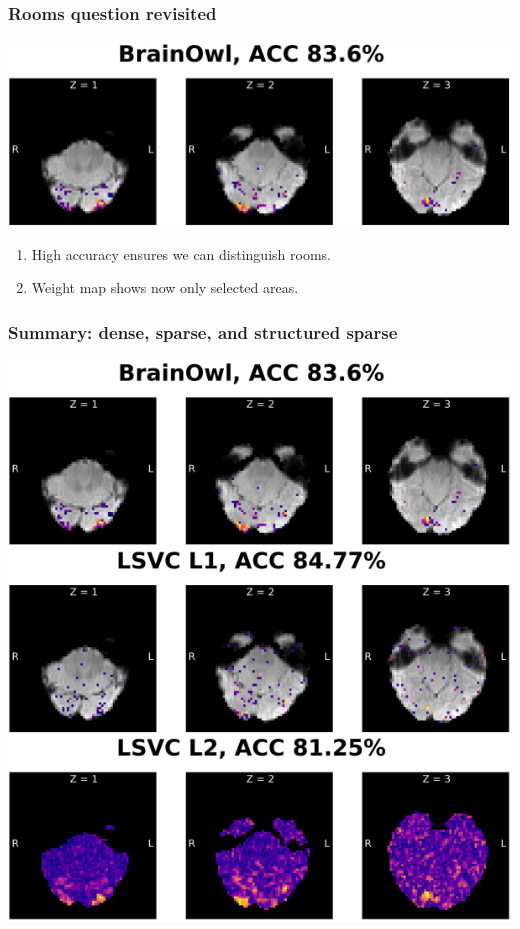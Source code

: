 \documentclass[11pt]{beamer}
\begin{document}
\begin{frame}
    \frametitle{Rooms question revisited}

    \vspace*{-2cm}

    \begin{center}
        \includegraphics[scale=0.7]{figures/brainowl-axial.png}
    \end{center}

    \begin{enumerate}
        \item High accuracy ensures we can distinguish rooms.
        \item Weight map shows now only selected areas.
    \end{enumerate}

\end{frame}

\begin{frame}
    \frametitle{Summary: dense, sparse, and structured sparse}

    \begin{center}
        \includegraphics[scale=0.45]{figures/dense_sparse_structured-sparse.png}
    \end{center}
\end{frame}
\end{document}

